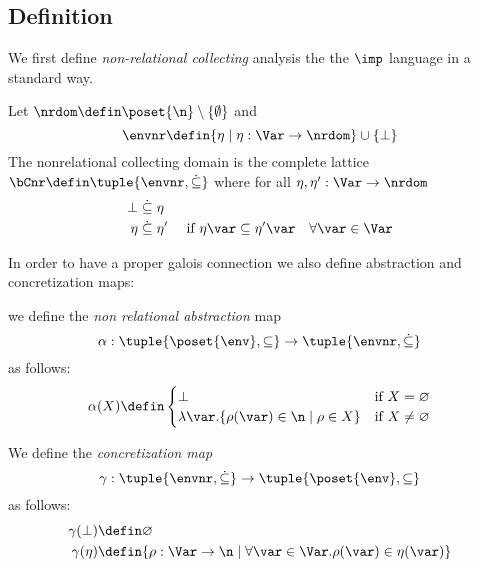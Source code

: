 \subsection{Definition}
\label{sub:nonrel}

We first define \emph{non-relational collecting} analysis the the
\(\imp\) language in a standard way.

\begin{definition}
  Let \(\nrdom \defin \poset{\n} \setminus \{\emptyset\}\) and
  \begin{equation*}
    \envnr \defin \{\eta \mid \eta: \Var \to \nrdom\} \cup \{\bot\}
  \end{equation*}
  The nonrelational collecting domain is the complete lattice
  \(\bCnr \defin \tuple{\envnr,\dot{\subseteq}}\) where for all
  \(\eta,\eta':\Var \to \nrdom\)
  \begin{align*}
    \bot & \mathrel{\dot{\subseteq}} \eta\\
    \eta & \mathrel{\dot{\subseteq}} \eta' & \text{ if } \eta\var\subseteq \eta'\var \quad \forall \var\in \Var
  \end{align*}
\end{definition}

In order to have a proper galois connection we also define abstraction
and concretization maps:

\begin{definition}
  we define the \emph{non relational abstraction} map
  \[\alpha: \tuple{\poset{\env},\subseteq} \to
  \tuple{\envnr,\dot{\subseteq}}\] as follows:
  \begin{equation*}
    \alpha(X) \defin 
      \begin{cases}
        \bot & \text{if }X=\varnothing \\
        \lambda \var. \{\rho(\var) \in \n \mid \rho \in X\} & \text{if }X\neq \varnothing\\
      \end{cases}
  \end{equation*}
\end{definition}

\begin{definition}
  We define the \emph{concretization map}
  \[\gamma: \tuple{\envnr,\dot{\subseteq}} \to
  \tuple{\poset{\env},\subseteq}\] as follows:
  \begin{align*}
    \gamma(\bot) & \defin \varnothing \\
    \gamma(\eta) & \defin \{\rho : \Var \to \n \mid \forall \var \in \Var. \rho(\var)\in \eta(\var)\}
  \end{align*}
\end{definition}

